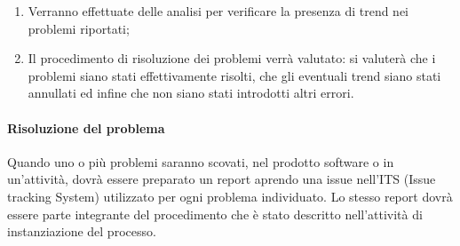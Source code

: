 \begin{enumerate}
				\item Verranno effettuate delle analisi per verificare la presenza di trend nei problemi riportati;

				\item Il procedimento di risoluzione dei problemi verrà valutato: si valuterà che i problemi siano stati effettivamente risolti, che gli eventuali trend siano stati annullati ed infine che non siano stati introdotti altri errori.
			\end{enumerate}
		\paragraph{Risoluzione del problema}
			Quando uno o più problemi saranno scovati, nel prodotto software o in un'attività, dovrà essere preparato un report aprendo una issue nell'ITS (Issue tracking System) utilizzato per ogni problema individuato. Lo stesso report dovrà essere parte integrante del procedimento che è stato descritto nell'attività di instanziazione del processo.
